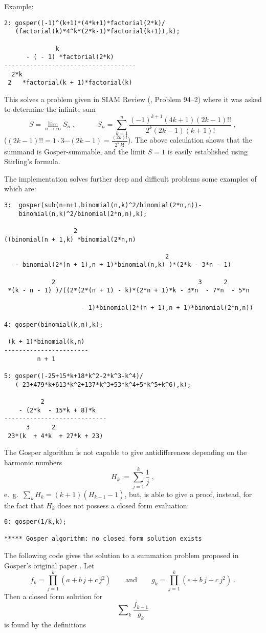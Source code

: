Example:

{\small
\begin{verbatim}
2: gosper((-1)^(k+1)*(4*k+1)*factorial(2*k)/
   (factorial(k)*4^k*(2*k-1)*factorial(k+1)),k);

              k
      - ( - 1) *factorial(2*k)
------------------------------------
  2*k
 2   *factorial(k + 1)*factorial(k)
\end{verbatim}
}\noindent
This solves a problem given in SIAM Review (\cite{OverhauserKim:94}, Problem 94--2)
where it was asked to determine the infinite sum
\[
S=\lim_{n\rightarrow\infty} S_n
\;,
\quad\quad\quad
S_n=\sum_{k=1}^n
\frac{(-1)^{k+1}(4k+1)(2k-1)!!}{2^k(2k-1)(k+1)!}
\;,
\]
($(2k-1)!!=1\cdot 3 \cdots (2k-1)=\frac{(2k)!}{2^k\,k!}$).
The above calculation shows that the summand is Gosper-summable,
and the limit $S=1$ is easily established using Stirling's formula.

The implementation solves further deep and difficult problems some examples of
which are:%

{\small
\begin{verbatim}
3:  gosper(sub(n=n+1,binomial(n,k)^2/binomial(2*n,n))-
    binomial(n,k)^2/binomial(2*n,n),k);

                   2
((binomial(n + 1,k) *binomial(2*n,n)

                                            2
   - binomial(2*(n + 1),n + 1)*binomial(n,k) )*(2*k - 3*n - 1)

             2                                       3      2
 *(k - n - 1) )/((2*(2*(n + 1) - k)*(2*n + 1)*k - 3*n  - 7*n  - 5*n

                     - 1)*binomial(2*(n + 1),n + 1)*binomial(2*n,n))

4: gosper(binomial(k,n),k);

 (k + 1)*binomial(k,n)
-----------------------
         n + 1

5: gosper((-25+15*k+18*k^2-2*k^3-k^4)/
   (-23+479*k+613*k^2+137*k^3+53*k^4+5*k^5+k^6),k);

          2
    - (2*k  - 15*k + 8)*k
----------------------------
      3      2
 23*(k  + 4*k  + 27*k + 23)
\end{verbatim}
}\noindent
The Gosper algorithm is not capable to give antidifferences depending
on the harmonic numbers
\[
H_k:=\sum_{j=1}^k\frac{1}{j}
\;,
\]
e.\ g.\ $\sum_k H_k=(k+1)(H_{k+1}-1)$, but, is able to give a proof, instead,
for the fact that $H_k$ does not possess a closed form evaluation:

{\small
\begin{verbatim}
6: gosper(1/k,k);

***** Gosper algorithm: no closed form solution exists
\end{verbatim}
}\noindent
The following code gives the solution to a summation problem proposed in
Gosper's original paper \cite{Gosper:78}. Let
\[
f_k=\prod_{j=1}^k (a+b\,j+c\,j^2)
\quad\quad\mbox{and}\quad\quad
g_k=\prod_{j=1}^k (e+b\,j+c\,j^2)
\;.
\]
Then a closed form solution for
\[
\sum\nolimits_k\frac{f_{k-1}}{g_{k}}
\]
is found by the definitions

